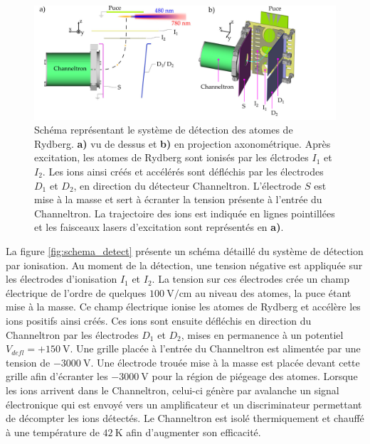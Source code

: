 %
\begin{figure}[h]
\centering
\includegraphics[width=\linewidth]{figures/setup/rydberg/schema_detect}
\caption[Système de détection des atomes de Rydberg]{Schéma représentant le système de détection des atomes de Rydberg.
\textbf{a)} vu de dessus et \textbf{b)} en projection axonométrique.
Après excitation, les atomes de Rydberg sont ionisés par les élctrodes $I_1$ et $I_2$.
Les ions ainsi créés et accélérés sont défléchis par les électrodes $D_1$ et $D_2$, en direction du détecteur Channeltron.
L'électrode $S$ est mise à la masse et sert à écranter la tension présente à l'entrée du Channeltron.
La trajectoire des ions est indiquée en lignes pointillées et les faisceaux lasers d'excitation sont représentés en \textbf{a)}.
}
\label{fig:schema_detect}
\end{figure}
%
La figure \eqref{fig:schema_detect} présente un schéma détaillé du système de détection par ionisation.
Au moment de la détection, une tension négative est appliquée sur les électrodes d'ionisation $I_1$ et $I_2$.
La tension sur ces électrodes crée un champ électrique de l'ordre de quelques $\SI{100}{\V/\cm}$ au niveau des atomes, la puce étant mise à la masse.
Ce champ électrique ionise les atomes de Rydberg et accélère les ions positifs ainsi créés.
Ces ions sont ensuite défléchis en direction du Channeltron par les électrodes $D_1$ et $D_2$, mises en permanence à un potentiel $V_{defl} = +\SI{150}{\V}$.
Une grille placée à l'entrée du Channeltron est alimentée par une tension de $\SI{-3000}{\V}$.
Une électrode trouée mise à la masse est placée devant cette grille afin d'écranter les $\SI{-3000}{\V}$ pour la région de piégeage des atomes.
Lorsque les ions arrivent dans le Channeltron, celui-ci génère par avalanche un signal électronique qui est envoyé vers un amplificateur et un discriminateur permettant de décompter les ions détectés.
Le Channeltron est isolé thermiquement et chauffé à une température de $\SI{42}{\K}$ afin d'augmenter son efficacité.

\newpage
